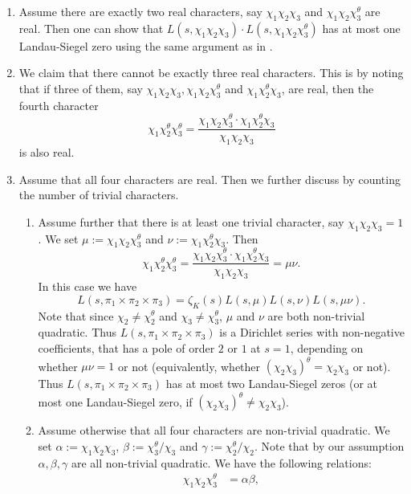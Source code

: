\documentclass[12pt]{amsart}
\begin{document}
\begin{enumerate}
\begin{enumerate}
        \item Assume there are exactly two real characters, say $\chi_1\chi_2\chi_3$ and $\chi_1\chi_2\chi_3^\theta$ are real. Then one can show that $L(s,\chi_1\chi_2\chi_3) \cdot L(s,\chi_1\chi_2\chi_3^\theta)$ has at most one Landau-Siegel zero using the same argument as in \cite[Section 4]{RamakrishnanWang2003}.
        \item We claim that there cannot be exactly three real characters. This is by noting that if three of them, say $\chi_1\chi_2\chi_3,\chi_1\chi_2\chi_3^\theta$ and $\chi_1\chi_2^\theta\chi_3$, are real, then the fourth character 
        $$\chi_1\chi_2^{\theta}\chi_3^{\theta} = \frac{\chi_1\chi_2\chi_3^{\theta} \cdot \chi_1\chi_2^{\theta}\chi_3 }{\chi_1\chi_2\chi_3}$$
        is also real.
        \item Assume that all four characters are real. Then we further discuss by counting the number of trivial characters.
        \begin{enumerate}
            \item Assume further that there is at least one trivial character, say $\chi_1\chi_2\chi_3 = 1$. We set $\mu := \chi_1\chi_2\chi_3^\theta$ and $\nu := \chi_1\chi_2^\theta\chi_3$. Then 
            $$\chi_1\chi_2^{\theta}\chi_3^{\theta} = \frac{\chi_1\chi_2\chi_3^{\theta} \cdot \chi_1\chi_2^{\theta}\chi_3 }{\chi_1\chi_2\chi_3} = \mu\nu.$$
            In this case we have 
            $$L(s,\pi_1 \times \pi_2 \times \pi_3) = \zeta_K(s) L(s,\mu)L(s,\nu)L(s,\mu\nu).$$
            Note that since $\chi_2 \neq \chi_2^\theta$ and $\chi_3 \neq \chi_3^\theta$, $\mu$ and $\nu$ are both non-trivial quadratic. Thus $L(s,\pi_1 \times \pi_2 \times \pi_3)$ is a Dirichlet series with non-negative coefficients, that has a pole of order $2$ or $1$ at $s=1$, depending on whether $\mu\nu = 1$ or not (equivalently, whether $(\chi_2\chi_3)^\theta = \chi_2\chi_3$ or not). Thus $L(s,\pi_1 \times \pi_2 \times \pi_3)$ has at most two Landau-Siegel zeros (or at most one Landau-Siegel zero, if $(\chi_2\chi_3)^\theta \neq \chi_2\chi_3$).
            \item Assume otherwise that all four characters are non-trivial quadratic. We set $\alpha := \chi_1\chi_2\chi_3$, $\beta := \chi_3^\theta/\chi_3$ and $\gamma := \chi_2^\theta/\chi_2$. Note that by our assumption $\alpha,\beta,\gamma$ are all non-trivial quadratic. We have the following relations:
            \begin{align*}
                    \chi_1\chi_2\chi_3^{\theta} &= \alpha\beta, \\

\end{align*}
\end{enumerate}
\end{enumerate}
\end{enumerate}
\end{document}
